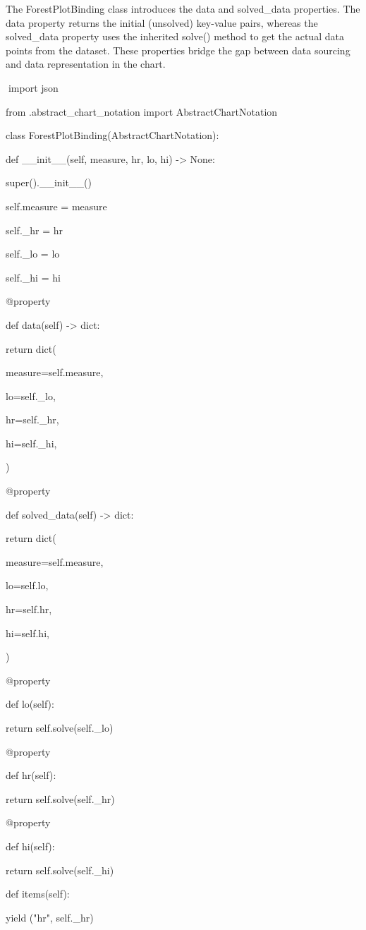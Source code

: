 \documentclass[
]{article}
\begin{document}
The ForestPlotBinding class introduces the data and solved\_data
properties. The data property returns the initial (unsolved) key-value
pairs, whereas the solved\_data property uses the inherited solve()
method to get the actual data points from the dataset. These properties
bridge the gap between data sourcing and data representation in the
chart.

import json

from .abstract\_chart\_notation import AbstractChartNotation

class ForestPlotBinding(AbstractChartNotation):

def \_\_init\_\_(self, measure, hr, lo, hi) -\textgreater{} None:

super().\_\_init\_\_()

self.measure = measure

self.\_hr = hr

self.\_lo = lo

self.\_hi = hi

@property

def data(self) -\textgreater{} dict:

return dict(

measure=self.measure,

lo=self.\_lo,

hr=self.\_hr,

hi=self.\_hi,

)

@property

def solved\_data(self) -\textgreater{} dict:

return dict(

measure=self.measure,

lo=self.lo,

hr=self.hr,

hi=self.hi,

)

@property

def lo(self):

return self.solve(self.\_lo)

@property

def hr(self):

return self.solve(self.\_hr)

@property

def hi(self):

return self.solve(self.\_hi)

def items(self):

yield ("hr", self.\_hr)
\end{document}
